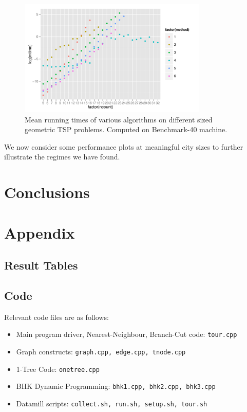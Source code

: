 \documentclass[11pt]{article}
\begin{document}
\begin{figure}[H]
\center
\includegraphics[width=0.8\textwidth]{b40-log}
\caption{Mean running times of various algorithms on different sized geometric TSP problems. Computed on Benchmark-40 machine.}
\end{figure}

We now consider some performance plots at meaningful city sizes to further illustrate the regimes we have found.

\section{Conclusions}
\label{sec:conclusions}


\nocite{*}



\section*{Appendix}
\subsection*{Result Tables}
\subsection*{Code}
Relevant code files are as follows:

\begin{itemize}
\item Main program driver, Nearest-Neighbour, Branch-Cut code: \texttt{tour.cpp}
\item Graph constructs: \texttt{graph.cpp, edge.cpp, tnode.cpp}
\item 1-Tree Code: \texttt{onetree.cpp}
\item BHK Dynamic Programming: \texttt{bhk1.cpp, bhk2.cpp, bhk3.cpp}
\item Datamill scripts: \texttt{collect.sh, run.sh, setup.sh, tour.sh}
\end{itemize}


\end{document}

